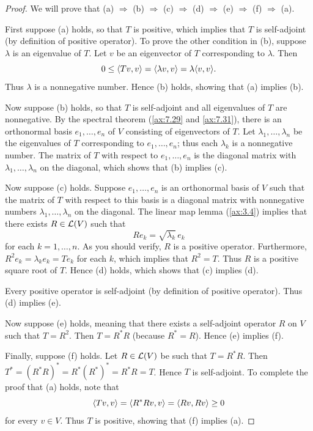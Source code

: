 \begin{proof}
We will prove that (a) $\Rightarrow$ (b) $\Rightarrow$ (c) $\Rightarrow$ (d)
$\Rightarrow$ (e) $\Rightarrow$ (f) $\Rightarrow$ (a).

First suppose (a) holds, so that $T$ is positive, which implies that $T$ is
self-adjoint (by definition of positive operator). To prove the other condition
in (b), suppose $\lambda$ is an eigenvalue of $T$. Let $v$ be an eigenvector of
$T$ corresponding to $\lambda$. Then
\[ 0\le\langle Tv, v \rangle=\langle \lambda v, v \rangle=\lambda\langle v, v \rangle. \]
Thus $\lambda$ is a nonnegative number. Hence (b) holds, showing that (a)
implies (b).

Now suppose (b) holds, so that $T$ is self-adjoint and all eigenvalues of $T$
are nonnegative. By the spectral theorem (\ref{ax:7.29} and \ref{ax:7.31}),
there is an orthonormal basis $e_1,\dots,e_n$ of $V$ consisting of eigenvectors
of $T$. Let $\lambda_1,\dots,\lambda_n$ be the eigenvalues of $T$ corresponding
to $e_1,\dots,e_n$; thus each $\lambda_k$ is a nonnegative number. The matrix of
$T$ with respect to $e_1,\dots,e_n$ is the diagonal matrix with
$\lambda_1,\dots,\lambda_n$ on the diagonal, which shows that (b) implies (c).

Now suppose (c) holds. Suppose $e_1,\dots,e_n$ is an orthonormal basis of $V$
such that the matrix of $T$ with respect to this basis is a diagonal matrix with
nonnegative numbers $\lambda_1,\dots,\lambda_n$ on the diagonal. The linear map
lemma (\ref{ax:3.4}) implies that there exists $R\in\mathcal{L}(V)$ such that
\[ Re_k=\sqrt{\lambda_k}\,e_k \]
for each $k=1,\dots,n$. As you should verify, $R$ is a positive operator.
Furthermore, $R^2e_k=\lambda_ke_k=Te_k$ for each $k$, which implies that
$R^2=T$. Thus $R$ is a positive square root of $T$. Hence (d) holds, which shows
that (c) implies (d).

Every positive operator is self-adjoint (by definition of positive operator).
Thus (d) implies (e).

Now suppose (e) holds, meaning that there exists a self-adjoint operator $R$ on
$V$ such that $T=R^2$. Then $T=R^*R$ (because $R^*=R$). Hence (e) implies (f).

Finally, suppose (f) holds. Let $R\in\mathcal{L}(V)$ be such that $T=R^*R$. Then
$T^*=(R^*R)^*=R^*(R^*)^*=R^*R=T$. Hence $T$ is self-adjoint. To complete the
proof that (a) holds, note that
\[ \langle Tv, v \rangle=\langle R^*Rv, v \rangle=\langle Rv, Rv \rangle\ge0 \]
for every $v\in V$. Thus $T$ is positive, showing that (f) implies (a).
\end{proof}

